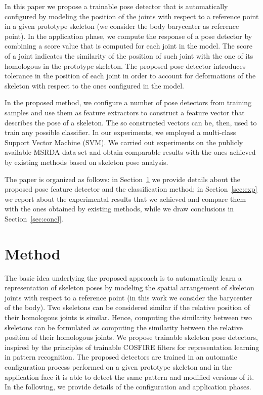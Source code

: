 \documentclass[runningheads,a4paper]{llncs}
\begin{document}
In this paper we propose a trainable pose detector that is automatically configured by modeling the position of the joints with respect to a reference point in a given prototype skeleton (we consider the body barycenter as reference point). 
In the application phase, we compute the response of a pose detector by combining a score value that is computed for each joint in the model. The score of a joint indicates the similarity of the position of such joint with the one of its homologous in the prototype skeleton.
The proposed pose detector introduces tolerance in the position of each joint  in order to account for deformations of the skeleton with respect to the ones configured in the model.

In the proposed method, we configure a number of pose detectors from training samples and use them as feature extractors to construct a feature vector that describes the pose of a skeleton. The so constructed vectors can be, then, used to train any possible classifier. In our experiments, we employed a multi-class Support Vector Machine (SVM).
We carried out experiments on the publicly available MSRDA data set and obtain comparable results with the ones achieved by existing methods based on skeleton pose analysis. 


The paper is organized as follows: in Section~\ref{sec:proposed} we provide details about the proposed pose feature detector and the classification method; in Section~\ref{sec:exp} we report about the experimental results that we achieved and compare them with the ones obtained by existing methods, while we draw conclusions in Section~\ref{sec:concl}.
 




\section{Method}
\label{sec:proposed}

The basic idea underlying the proposed approach is to automatically learn a representation of skeleton poses by modeling the spatial arrangement of skeleton joints with respect to a reference point (in this work we consider the barycenter of the body). Two skeletons can be considered similar if the relative position of their homologous joints is similar. 
Hence, computing the similarity between two skeletons can be formulated as computing the similarity between the relative  position of their homologous joints. We propose trainable skeleton pose detectors, inspired by the principles of trainable COSFIRE filters for representation learning in pattern recognition. 
The proposed detectors are trained in an automatic configuration process performed on a given prototype skeleton and in the application face it is able to detect the same pattern and modified versions of it. In the following, we provide details of the configuration and application phases.
\end{document}
